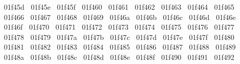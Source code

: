 {  ^^^^^^01f45d%
  ^^^^^^01f45e%
  ^^^^^^01f45f%
  ^^^^^^01f460%
  ^^^^^^01f461%
  ^^^^^^01f462%
  ^^^^^^01f463%
  ^^^^^^01f464%
  ^^^^^^01f465%
  ^^^^^^01f466%
  ^^^^^^01f467%
  ^^^^^^01f468%
  ^^^^^^01f469%
  ^^^^^^01f46a%
  ^^^^^^01f46b%
  ^^^^^^01f46c%
  ^^^^^^01f46d%
  ^^^^^^01f46e%
  ^^^^^^01f46f%
  ^^^^^^01f470%
  ^^^^^^01f471%
  ^^^^^^01f472%
  ^^^^^^01f473%
  ^^^^^^01f474%
  ^^^^^^01f475%
  ^^^^^^01f476%
  ^^^^^^01f477%
  ^^^^^^01f478%
  ^^^^^^01f479%
  ^^^^^^01f47a%
  ^^^^^^01f47b%
  ^^^^^^01f47c%
  ^^^^^^01f47d%
  ^^^^^^01f47e%
  ^^^^^^01f47f%
  ^^^^^^01f480%
  ^^^^^^01f481%
  ^^^^^^01f482%
  ^^^^^^01f483%
  ^^^^^^01f484%
  ^^^^^^01f485%
  ^^^^^^01f486%
  ^^^^^^01f487%
  ^^^^^^01f488%
  ^^^^^^01f489%
  ^^^^^^01f48a%
  ^^^^^^01f48b%
  ^^^^^^01f48c%
  ^^^^^^01f48d%
  ^^^^^^01f48e%
  ^^^^^^01f48f%
  ^^^^^^01f490%
  ^^^^^^01f491%
  ^^^^^^01f492%
}
